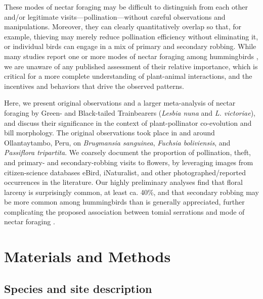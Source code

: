 \documentclass[fleqn,10pt,lineno]{wlpeerj}
\begin{document}
These modes of nectar foraging may be difficult to distinguish from each other and/or legitimate visits---pollination---without careful observations and manipulations.
Moreover, they can clearly quantitatively overlap so that, for example, thieving may merely reduce pollination efficiency without eliminating it, or individual birds can engage in a mix of primary and secondary robbing.
While many studies report one or more modes of nectar foraging among hummingbirds \citep{mcdade1980,roubik1985,feinsinger1987,ornelas1994}, we are unaware of any published assessment of their relative importance, which is critical for a more complete understanding of plant-animal interactions, and the incentives and behaviors that drive the observed patterns.

Here, we present original observations and a larger meta-analysis of nectar foraging by Green- and Black-tailed Trainbearers (\textit{Lesbia nuna} and \textit{L. victoriae}), and discuss their significance in the context of plant-pollinator co-evolution and bill morphology. The original observations took place in and around Ollantaytambo, Peru, on \textit{Brugmansia sanguinea}, \textit{Fuchsia boliviensis}, and \textit{Passiflora tripartita}.  We coarsely document the proportion of pollination, theft, and primary- and secondary-robbing visits to flowers, by leveraging images from citizen-science databases eBird, iNaturalist, and other photographed/reported occurrences in the literature. Our highly preliminary analyses find that floral larceny is surprisingly common, at least ca. 40\%, and that secondary robbing may be more common among hummingbirds than is generally appreciated, further complicating the proposed association between tomial serrations and mode of nectar foraging \citep{ornelas1994,rico-guevara2019}. 
\\

\section*{Materials and Methods}

\subsection*{Species and site description}
\end{document}
